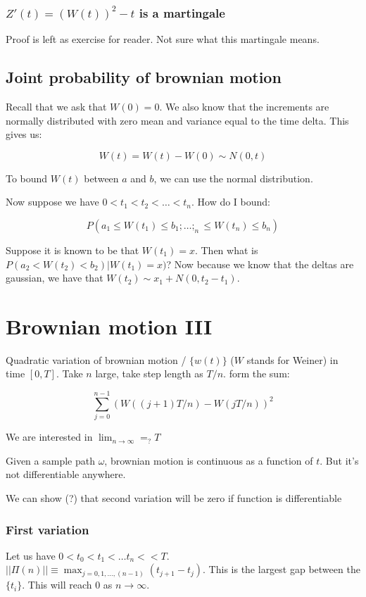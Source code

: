 \documentclass{book}
\theoremstyle{definition}
\begin{document}
\subsection{$Z'(t) = (W(t))^2 - t$ is a martingale}
Proof is left as exercise for reader. Not sure what this martingale means.

\section{Joint probability of brownian motion}
Recall that we ask that $W(0) = 0$.  We also know that the increments
are normally distributed with zero mean and variance equal to the time delta.
This gives us:

$$W(t) = W(t) - W(0) \sim N(0, t) $$

To bound $W(t)$ between $a$ and $b$, we can use the normal distribution. 


Now suppose we have $0 < t_1 < t_2 < \dots < t_n$. How do I bound:

$$
P(a_1 \leq W(t_1) \leq b_1; \dots; _n \leq W(t_n) \leq b_n)
$$

Suppose it is known to be that $W(t_1) = x$. Then what is $P(a_2 < W(t_2) < b_2) | W(t_1) = x)$?
Now because we know that the deltas are gaussian, we have that $W(t_2) \sim x_1 + N(0, t_2 - t_1)$.

\chapter{Brownian motion III}

Quadratic variation of brownian motion / $\{ w(t) \}$ ($W$ stands for Weiner)
in time $[0, T]$.  Take $n$ large, take step length as $T/n$. form the sum:

$$
\sum_{j=0}^{n-1} (W((j+1)T/n) - W(jT/n))^2
$$

We are interested in $\lim_{n \rightarrow \infty} =_? T$

Given a sample path $\omega$, brownian motion is continuous as a function of $t$.
But it's not differentiable anywhere.

We can show (?) that second variation will be zero if function is differentiable

\subsection{First variation}
Let us have $0 < t_0 < t_1 < \dots t_n < < T$.
$||\Pi(n)|| \equiv \max_{j=0,1,\dots,(n-1)} (t_{j+1} - t_j)$. This is the largest
gap between the $\{ t_i \}$. This will reach $0$ as $n \rightarrow \infty$.
\end{document}

